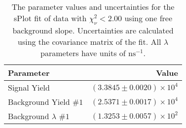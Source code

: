
\begin{table}[ht]
    \begin{center}
        \begin{tabular}{lr}\toprule
            Parameter & Value \\\midrule
            Signal Yield & $(3.3845 \pm 0.0020) \times 10^{4}$ \\
            Background Yield $\#1$ & $(2.5371 \pm 0.0017) \times 10^{4}$ \\
            Background $\lambda$ $\#1$ & $(1.3253 \pm 0.0057) \times 10^{2}$ \\\bottomrule
        \end{tabular}
        \caption{The parameter values and uncertainties for the sPlot fit of data with $\chi^2_\nu < 2.00$ using one free background slope. Uncertainties are calculated using the covariance matrix of the fit. All $\lambda$ parameters have units of $\si{\nano\second}^{-1}$.}\label{tab:splot-fit-results-chisqdof-2.00-free-1}
    \end{center}
\end{table}
